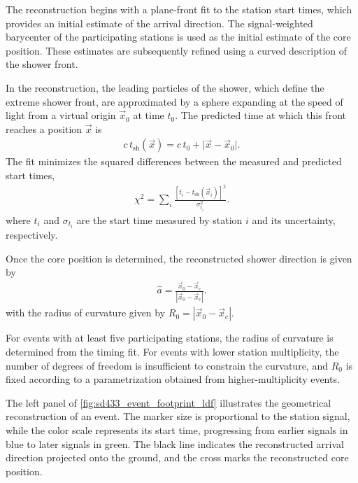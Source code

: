 \documentclass[main.tex]{subfiles}
\begin{document}
The reconstruction begins with a plane-front fit to the station start times, which provides an initial estimate of the arrival direction.
The signal-weighted barycenter of the participating stations is used as the initial estimate of the core position.
These estimates are subsequently refined using a curved description of the shower front.

In the \Offline reconstruction, the leading particles of the shower, which define the extreme shower front, are approximated by a sphere expanding at the speed of light from a virtual origin $\vec{x}_0$ at time $t_0$.
The predicted time at which this front reaches a position $\vec{x}$ is
\begin{align}
    c\,t_\mathrm{sh}(\vec{x}) = c\,t_0 + \lvert \vec{x}-\vec{x}_0 \rvert .
    \label{eq:spherical_shower_front}
\end{align}
The fit minimizes the squared differences between the measured and predicted start times,
\begin{align}
    \chi^2 = \sum_i \frac{\left[t_i-t_\mathrm{sh}(\vec{x}_i)\right]^2}{\sigma_{t_i}^2}.
    \label{eq:geometry_chi2}
\end{align}
where $t_i$ and $\sigma_{t_i}$ are the start time measured by station $i$ and its uncertainty, respectively.

Once the core position is determined, the reconstructed shower direction is given by
\begin{align}
    \hat{a}
    =
    \frac{\vec{x}_{0}-\vec{x}_{\mathrm{c}}}
    {\left|\vec{x}_{0}-\vec{x}_{\mathrm{c}}\right|}.
    \label{eq:shower_axis}
\end{align}
\noindent with the radius of curvature given by $R_{0}=\left|\vec{x}_{0}-\vec{x}_{\mathrm{c}}\right|$.

For events with at least five participating stations, the radius of curvature is determined from the timing fit.
For events with lower station multiplicity, the number of degrees of freedom is insufficient to constrain the curvature, and $R_{0}$ is fixed according to a parametrization obtained from higher-multiplicity events.

The left panel of \cref{fig:sd433_event_footprint_ldf} illustrates the geometrical reconstruction of an  event.
The marker size is proportional to the station signal, while the color scale represents its start time, progressing from earlier signals in blue to later signals in green.
The black line indicates the reconstructed arrival direction projected onto the ground, and the cross marks the reconstructed core position.
\end{document}
